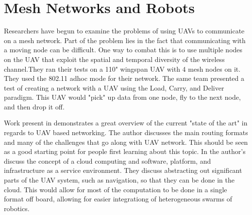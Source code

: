 \section{Mesh Networks and Robots}

Researchers have begun to examine the problems of using UAVs to communicate on a mesh network. Part of the problem lies in the fact that communicating
with a moving node can be difficult. One way to combat this is to use multiple nodes on the UAV that exploit the spatial and temporal diversity of the wireless
channel.They ran their tests on a 110" wingspan UAV with 4 mesh nodes on it. They used the 802.11 adhoc mode for their network. \cite{5700251} 
The same team presented a test of creating a network with a UAV using the Load, Carry, and Deliver paradigm. This UAV would "pick" up data from one node, fly to the
next node, and then drop it off. \cite{4225050} 

Work present in \cite{6564779} demonstrates a great overview of the current "state of the art" in regards to UAV
based networking. The author discusses the main routing formats and many of the challenges that go along with UAV network. This should be seen as a good starting
point for people first learning about this topic. In \cite{6842275} the author's discuss the concept of a cloud computing and software, platform, and infrastructure
as a service environment. They discuss abstracting out significant parts of the UAV system, such as navigation, so that they can be done in the cloud. This would
allow for most of the computation to be done in a single format off board, allowing for easier integrationg of heterogeneous swarms of robotics. 
